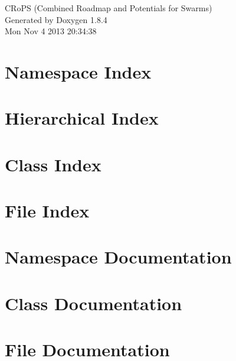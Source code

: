 \documentclass[twoside]{book}
\newcommand{\clearemptydoublepage}{%
  \newpage{\pagestyle{empty}\cleardoublepage}%
}
\begin{document}
\hypersetup{pageanchor=false}
\begin{titlepage}
\vspace*{7cm}
\begin{center}%
{\Large C\-Ro\-P\-S (Combined Roadmap and Potentials for Swarms) }\\
\vspace*{1cm}
{\large Generated by Doxygen 1.8.4}\\
\vspace*{0.5cm}
{\small Mon Nov 4 2013 20:34:38}\\
\end{center}
\end{titlepage}
\clearemptydoublepage
\tableofcontents
\clearemptydoublepage
{}
\hypersetup{pageanchor=true}

\chapter{Namespace Index}

\chapter{Hierarchical Index}

\chapter{Class Index}

\chapter{File Index}

\chapter{Namespace Documentation}











\chapter{Class Documentation}









\chapter{File Documentation}












\newpage
{}
{}
\printindex
\end{document}
